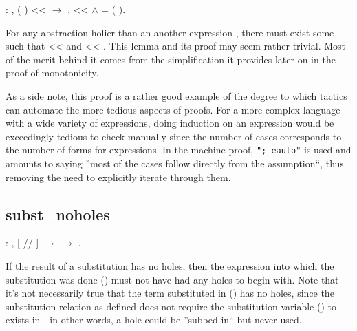 \documentclass[12pt]{report}
\begin{document}
\begin{coqdoccode}
\coqdocemptyline
\coqdocindent{1.00em}
  : \coqdockw{\ensuremath{\forall}}    ,\coqdoceol
\coqdocindent{2.00em}
(   ) <<  \ensuremath{\rightarrow}\coqdoceol
\coqdocindent{2.00em}
\coqdoctac{\ensuremath{\exists}} ,  <<  \ensuremath{\land}  = (   ).\coqdoceol
\coqdocemptyline
\end{coqdoccode}
For any abstraction     holier than an another
expression , there must exist some  such that  <<
 and     <<    . This lemma and its
proof may seem rather trivial. Most of the merit behind it comes from
the simplification it provides later on in the proof of
monotonicity.


As a side note, this proof is a rather good example of the degree to
which tactics can automate the more tedious aspects of proofs. For
a more complex language with a wide variety of expressions, doing
induction on an expression would be exceedingly tedious to check
manually since the number of cases corresponds to the number of forms
for expressions. In the machine proof, \texttt{"; eauto"} is used and
amounts to saying ''most of the cases follow directly from the
assumption``, thus removing the need to explicitly iterate through
them. 

\subsection{subst\_noholes}

\begin{coqdoccode}
\coqdocemptyline
\coqdocindent{1.00em}
  : \coqdockw{\ensuremath{\forall}}    ,\coqdoceol
\coqdocindent{2.00em}
[  //  ]    \ensuremath{\rightarrow}\coqdoceol
\coqdocindent{2.00em}
  \ensuremath{\rightarrow}\coqdoceol
\coqdocindent{2.00em}
 .\coqdoceol
\coqdocemptyline
\end{coqdoccode}
If the result of a substitution has no holes, then the expression
into which the substitution was done () must not have had any
holes to begin with. Note that it's not necessarily true that the
term substituted in () has no holes, since the substitution
relation as defined does not require the substitution variable ()
to exists in  - in other words, a hole could be ''subbed in`` but
never used.
\end{document}
